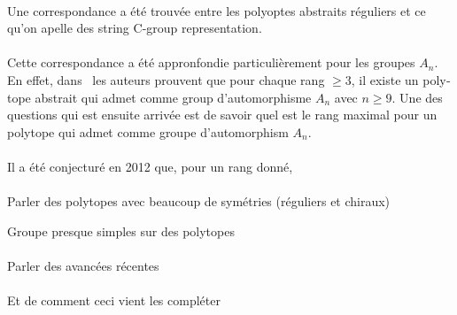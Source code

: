 \begin{otherlanguage}{french}
\paragraph{}
Une correspondance a été trouvée entre les polyoptes abstraits réguliers et ce qu'on apelle des string C-group representation.

\paragraph{}
Cette correspondance a été appronfondie particulièrement pour les groupes $A_n$. En effet, dans~\cite{} les auteurs prouvent que pour chaque rang $\ge 3$, il existe un polytope abstrait qui admet comme group d'automorphisme $A_n$ avec $n \ge 9$. Une des questions qui est ensuite arrivée est de savoir quel est le rang maximal pour un polytope qui admet comme groupe d'automorphism $A_n$.

\paragraph{}
Il a été conjecturé en 2012 que, pour un rang donné, 

\paragraph{}
Parler des polytopes avec beaucoup de symétries (réguliers et chiraux)

Groupe presque simples sur des polytopes

\paragraph{}
Parler des avancées récentes

\paragraph{}
Et de comment ceci vient les compléter

\end{otherlanguage}
